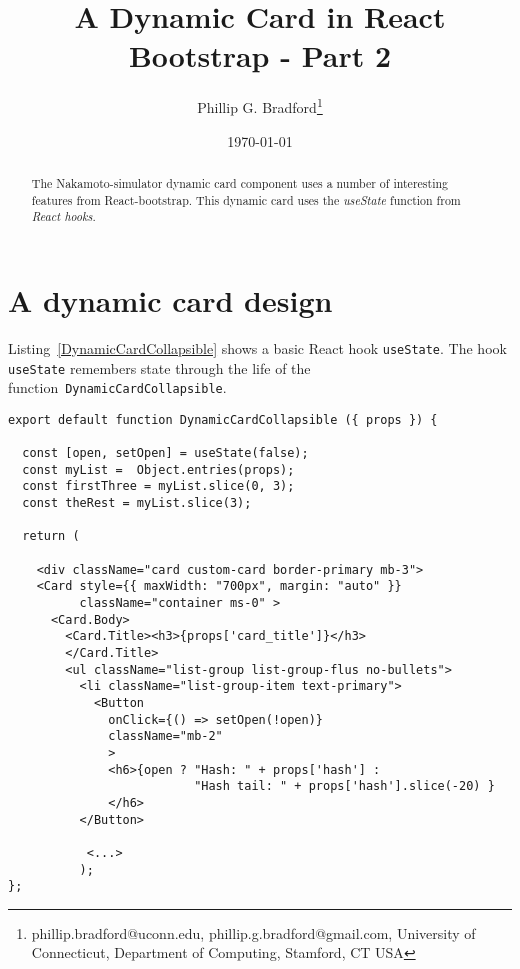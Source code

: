 \documentclass[12pt]{article}
\begin{document}
\title{A Dynamic {\bf Card} in React Bootstrap  - Part 2}
\author{
Phillip G. Bradford\thanks{phillip.bradford@uconn.edu, phillip.g.bradford@gmail.com,
{\sc University of Connecticut, Department of Computing, Stamford, CT USA}}
}

\date{\small\today}

\maketitle

%
%
%
\begin{abstract}
The Nakamoto-simulator dynamic card component uses a number of 
interesting features from React-bootstrap.
This dynamic card uses the {\em useState} function from {\em React hooks}.
\end{abstract}

%
%
%
%

%
%
\section{A dynamic card design}
\label{burn block dynamic card}


Listing~\ref{DynamicCardCollapsible} shows a basic React hook \lstinline|useState|.
The hook \lstinline|useState| remembers state through the life of the function~\lstinline|DynamicCardCollapsible|.

%
%
\vspace{0.2in}
%
%

\begin{lstlisting}[label=DynamicCardCollapsible,style=JSES6Base, caption={Dynamic card}]
  export default function DynamicCardCollapsible ({ props }) {

  const [open, setOpen] = useState(false);
  const myList =  Object.entries(props);
  const firstThree = myList.slice(0, 3);
  const theRest = myList.slice(3);

  return (

    <div className="card custom-card border-primary mb-3">
    <Card style={{ maxWidth: "700px", margin: "auto" }} 
		  className="container ms-0" >
      <Card.Body>
        <Card.Title><h3>{props['card_title']}</h3>
        </Card.Title>
        <ul className="list-group list-group-flus no-bullets">
          <li className="list-group-item text-primary">
            <Button
              onClick={() => setOpen(!open)}
              className="mb-2"
              >
              <h6>{open ? "Hash: " + props['hash'] :  
			              "Hash tail: " + props['hash'].slice(-20) }
			  </h6>
          </Button>
		  
		   <...>
		  );
};
\end{lstlisting}
\end{document}
